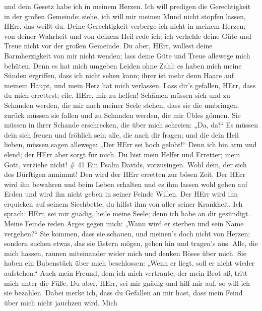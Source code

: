 und dein Gesetz habe ich in meinem Herzen.  Ich will
predigen die Gerechtigkeit in der großen Gemeinde; siehe, ich will mir
meinen Mund nicht stopfen lassen, HErr, das weißt du. 
Deine Gerechtigkeit verberge ich nicht in meinem Herzen; von deiner
Wahrheit und von deinem Heil rede ich; ich verhehle deine Güte und Treue
nicht vor der großen Gemeinde.  Du aber, HErr, wollest
deine Barmherzigkeit von mir nicht wenden; lass deine Güte und Treue
allewege mich behüten.  Denn es hat mich umgeben Leiden
ohne Zahl; es haben mich meine Sünden ergriffen, dass ich nicht sehen
kann; ihrer ist mehr denn Haare auf meinem Haupt, und mein Herz hat mich
verlassen.  Lass dir's gefallen, HErr, dass du mich
errettest; eile, HErr, mir zu helfen!  Schämen müssen sich
und zu Schanden werden, die mir nach meiner Seele stehen, dass sie die
umbringen; zurück müssen sie fallen und zu Schanden werden, die mir
Übles gönnen.  Sie müssen in ihrer Schande erschrecken, die
über mich schreien: „Da, da!{}``  Es müssen dein sich
freuen und fröhlich sein alle, die nach dir fragen; und die dein Heil
lieben, müssen sagen allewege: „Der HErr sei hoch gelobt!{}``
 Denn ich bin arm und elend; der HErr aber sorgt für mich.
Du bist mein Helfer und Erretter; mein Gott, verziehe nicht! \# 41
 Ein Psalm Davids, vorzusingen.  Wohl dem, der
sich des Dürftigen annimmt! Den wird der HErr erretten zur bösen Zeit.
 Der HErr wird ihn bewahren und beim Leben erhalten und es
ihm lassen wohl gehen auf Erden und wird ihn nicht geben in seiner
Feinde Willen.  Der HErr wird ihn erquicken auf seinem
Siechbette; du hilfst ihm von aller seiner Krankheit.  Ich
sprach: HErr, sei mir gnädig, heile meine Seele; denn ich habe an dir
gesündigt.  Meine Feinde reden Arges gegen mich: „Wann wird
er sterben und sein Name vergehen?{}``  Sie kommen, dass sie
schauen, und meinen's doch nicht von Herzen; sondern suchen etwas, das
sie lästern mögen, gehen hin und tragen's aus.  Alle, die
mich hassen, raunen miteinander wider mich und denken Böses über mich.
 Sie haben ein Bubenstück über mich beschlossen: „Wenn er
liegt, soll er nicht wieder aufstehen.``  Auch mein Freund,
dem ich mich vertraute, der mein Brot aß, tritt mich unter die Füße.
 Du aber, HErr, sei mir gnädig und hilf mir auf, so will
ich sie bezahlen.  Dabei merke ich, dass du Gefallen an mir
hast, dass mein Feind über mich nicht jauchzen wird.  Mich
